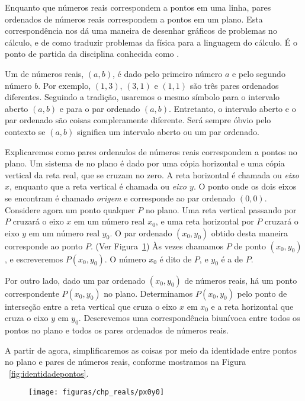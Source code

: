 \documentclass{svmono}
\begin{document}
Enquanto que números reais correspondem a pontos em uma linha, pares
ordenados de números reais correspondem a pontos em um plano. Esta
correspondência nos dá uma maneira de desenhar gráficos de problemas
no cálculo, e de como traduzir problemas da física para a linguagem do
cálculo. É o ponto de partida da disciplina conhecida como
.

Um  de números reais, $( a,b )$, é dado
pelo primeiro número $a$ e pelo segundo número $b$. Por exemplo, $( 1,3 )$, $( 3,1 )$ e $( 1,1 )$ são três pares ordenados
diferentes. Seguindo a tradição, usaremos o mesmo símbolo para o intervalo
aberto $(a,b)$ e para o par ordenado $(a, b)$. Entretanto, o intervalo
aberto e o par ordenado são coisas compleramente diferente. Será sempre
óbvio pelo contexto se $(a,b)$ significa um intervalo aberto ou
um par ordenado.

Explicaremos como pares ordenados de números reais correspondem a
pontos no plano. Um sistema de  no
plano é dado por uma cópia horizontal e uma cópia vertical da reta
real, que se cruzam no zero. A reta horizontal é chamada  ou \emph{eixo $x$}, enquanto que a reta vertical é chamada
 ou \emph{eixo $y$}. O ponto onde os dois
eixos se encontram é chamado \emph{origem} e corresponde ao par
ordenado $(0,0)$. Considere agora um ponto qualquer $P$ no plano. Uma
reta vertical passando por $P$ cruzará o eixo $x$ em um número real
$x_0$, e uma reta horizontal por $P$ cruzará o eixo $y$ em um número
real $y_0$. O par ordenado $(x_0,y_0)$  obtido desta maneira corresponde
ao ponto $P$. (Ver Figura~\ref{fig:coordP}) Às vezes chamamos $P$ de ponto
$(x_0,y_0)$, e escreveremos $P(x_0,y_0)$. O número $x_0$ é dito
 de $P$, e $y_0$ é a  de $P$.

Por outro lado, dado um par ordenado $(x_0,y_0)$ de números reais, há um
ponto correspondente $P(x_0,y_0)$ no plano. Determinamos $P(x_0,y_0)$ pelo
ponto de interseção entre a reta vertical que cruza o eixo $x$ em $x_0$
e a reta horizontal que cruza o eixo $y$ em $y_0$. Descrevemos uma
correspondência biunívoca entre todos os pontos no plano e todos os
pares ordenados de números reais.

A partir de agora, simplificaremos as coisas por meio da identidade entre
pontos no plano e pares de números reais, conforme mostramos na Figura%
~\ref{fig:identidadepontos}.

\begin{figure}
\texttt{[image: figuras/chp\_reals/px0y0]}
\caption{}
\label{fig:coordP}
\end{figure}
\end{document}
